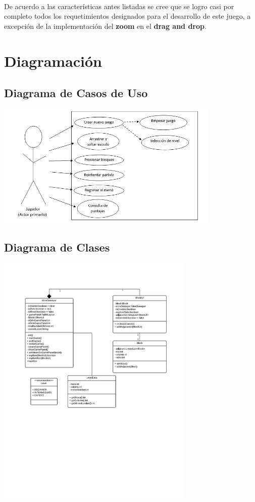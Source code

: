 \documentclass[11pt]{article}
\begin{document}
\paragraph{} \noindent De acuerdo a las características antes listadas se cree que se logro casi por completo todos los requetimientos designados para el desarrollo de este juego, a excepción de la implementación del {\textbf{zoom}} en el {\textbf{drag and drop}}.

\section{Diagramación}
\subsection{\textbf{Diagrama de Casos de Uso}}

				\begin{center}
				\includegraphics[width=0.8\textwidth]{images/casosDeUso}
				\end{center}

\subsection{\textbf{Diagrama de Clases}}

				\begin{center}
				\includegraphics[width=0.71\textwidth]{images/diagramaClase}
				\end{center}
\end{document}
